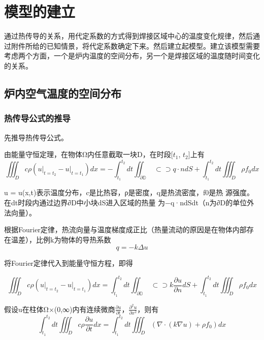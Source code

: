 \documentclass[withoutpreface,bwprint]{cumcmthesis} %
\begin{document}
\newpage
\section{模型的建立}
通过热传导的关系，用代定系数的方式得到焊接区域中心的温度变化规律，然后通过附件所给的已知情景，将代定系数确定下来。然后建立起模型。建立该模型需要考虑两个方面，一个是炉内温度的空间分布，另一个是焊接区域的温度随时间变化的关系。
\subsection{炉内空气温度的空间分布}

\subsubsection{热传导公式的推导}
先推导热传导公式。

由能量守恒定理，在物体Ω内任意截取一块D，在时段[$t_1$, $t_2$]上有
\begin{equation}\iiint_{D} c \rho\left(\left.u\right|_{t=t_{2}}-\left.u\right|_{t=t_{1}}\right) d x=-\int_{t_{1}}^{t_{2}} d t \iint_{\mathbb{\partial D}}\!\!\!\!\!\!\!\!\!\!\!\!\!\!\!\!\;\subset\!\supset q \cdot n d S+\int_{t_{1}}^{t_{2}} d t \iiint_{D} \rho f_{0} d x
\end{equation}

u = u(x,t)表示温度分布，c是比热容，ρ是密度，q是热流密度，f0是热 源强度。在dt时段内通过边界∂D中小块dS进入区域的热量 为−q·ndSdt（n为∂D的单位外法向量）。

根据Fourier定律，热流向量与温度梯度成正比（热量流动的原因是在物体内部存在温差），比例k为物体的导热系数
\begin{equation}
q = -k\Delta u
\end{equation}

将Fourier定律代入到能量守恒方程，即得

\begin{equation}\iiint_{D} c \rho\left(\left.u\right|_{t=t_{2}}-\left.u\right|_{t=t_{1}}\right) d x=\int_{t_{1}}^{t_{2}} d t \iint_{\mathbb{\partial D}}\!\!\!\!\!\!\!\!\!\!\!\!\!\!\!\!\;\subset\!\supset k \frac{\partial u}{\partial n} d S+\int_{t_{1}}^{t_{2}} d t \iiint_{D} \rho f_{0} d x
\end{equation}

假设u在柱体Ω×(0,∞)内有连续微商$\frac{\partial u}{\partial t}$，$\frac{\partial ^2 u}{\partial x^2}$，则有
\begin{equation}\int_{t_{1}}^{t_{2}} d t \iiint_{D} c \rho \frac{\partial u}{\partial t} d x=\int_{t_{1}}^{t_{2}} d t \iiint_{D}\left(\nabla \cdot(k \nabla u)+\rho f_{0}\right) d x
\end{equation}
\end{document}
